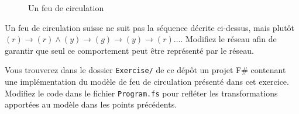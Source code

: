 \documentclass[a4paper, titlepage]{article}
\numberwithin{figure}{section}
\numberwithin{table}{section}
\begin{document}
\begin{figure}[ht]
\centering
{}
\caption{Un feu de circulation}
\label{fig:light}
\end{figure}

Un feu de circulation suisse ne suit pas la séquence décrite ci-dessus, mais plutôt $(r) \rightarrow (r) \land (y) \rightarrow (g) \rightarrow (y) \rightarrow (r) \dots$.
Modifiez le réseau afin de garantir que seul ce comportement peut être représenté par le réseau.

Vous trouverez dans le dossier \texttt{Exercise/} de ce dépôt un projet F\# contenant une implémentation du modèle de feu de circulation présenté dans cet exercice. 
Modifiez le code dans le fichier \texttt{Program.fs} pour refléter les transformations apportées au modèle dans les points précédents. 
\end{document}
